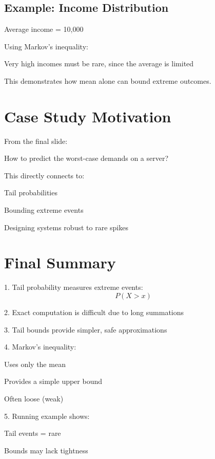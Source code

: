 \documentclass[11pt]{article}
\begin{document}
\subsection{Example: Income Distribution}

Average income = 10,000

Using Markov’s inequality:

Very high incomes must be rare, since the average is limited

This demonstrates how mean alone can bound extreme outcomes.

\section{Case Study Motivation}

From the final slide:

How to predict the worst-case demands on a server?

This directly connects to:

Tail probabilities

Bounding extreme events

Designing systems robust to rare spikes

\section{Final Summary}

1. Tail probability measures extreme events:
\[
P(X > x)
\]

2. Exact computation is difficult due to long summations

3. Tail bounds provide simpler, safe approximations

4. Markov’s inequality:

Uses only the mean

Provides a simple upper bound

Often loose (weak)

5. Running example shows:

Tail events = rare

Bounds may lack tightness
\end{document}
